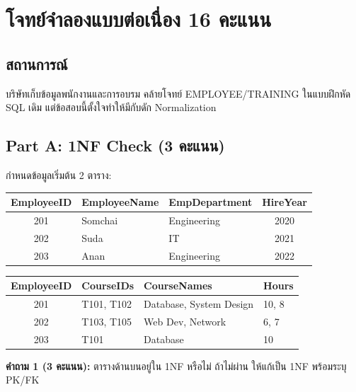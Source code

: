 \documentclass[a4paper,12pt]{article}
\begin{document}
\newpage
\section*{โจทย์จำลองแบบต่อเนื่อง 16 คะแนน}

\subsection*{สถานการณ์}
บริษัทเก็บข้อมูลพนักงานและการอบรม คล้ายโจทย์ EMPLOYEE/TRAINING ในแบบฝึกหัด SQL เดิม แต่ข้อสอบนี้ตั้งใจทำให้มีกับดัก Normalization

\subsection*{Part A: 1NF Check (3 คะแนน)}
กำหนดข้อมูลเริ่มต้น 2 ตาราง:

\begin{center}
\renewcommand{\arraystretch}{1.18}
\small
\begin{tabular}{|c|l|l|c|}
    \hline
    \rowcolor{gray!20}
    \textbf{EmployeeID} & \textbf{EmployeeName} & \textbf{EmpDepartment} & \textbf{HireYear} \\
    \hline
    201 & Somchai & Engineering & 2020 \\
    202 & Suda & IT & 2021 \\
    203 & Anan & Engineering & 2022 \\
    \hline
\end{tabular}
\end{center}

\begin{center}
\renewcommand{\arraystretch}{1.18}
\small
\begin{tabular}{|c|l|l|l|}
    \hline
    \rowcolor{gray!20}
    \textbf{EmployeeID} & \textbf{CourseIDs} & \textbf{CourseNames} & \textbf{Hours} \\
    \hline
    201 & T101, T102 & Database, System Design & 10, 8 \\
    202 & T103, T105 & Web Dev, Network & 6, 7 \\
    203 & T101 & Database & 10 \\
    \hline
\end{tabular}
\end{center}

\noindent\textbf{คำถาม 1 (3 คะแนน):} ตารางด้านบนอยู่ใน 1NF หรือไม่ ถ้าไม่ผ่าน ให้แก้เป็น 1NF พร้อมระบุ PK/FK

\vspace{4.6cm}
\end{document}
